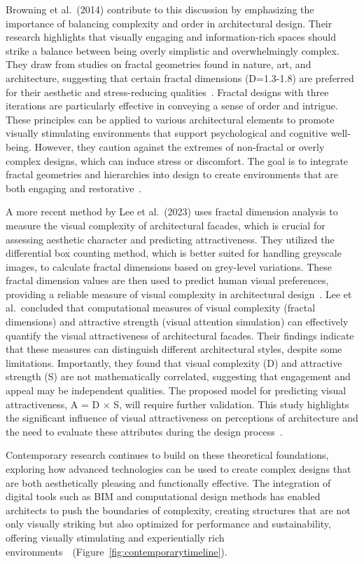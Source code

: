 Browning et al.~(2014) contribute to this discussion by emphasizing the importance of balancing complexity and order in architectural design.
Their research highlights that visually engaging and information-rich spaces should strike a balance between being overly simplistic and overwhelmingly complex.
They draw from studies on fractal geometries found in nature, art, and architecture, suggesting that certain fractal dimensions (D=1.3-1.8) are preferred for their aesthetic and stress-reducing qualities~\cite{Browning2014}.
Fractal designs with three iterations are particularly effective in conveying a sense of order and intrigue.
These principles can be applied to various architectural elements to promote visually stimulating environments that support psychological and cognitive well-being.
However, they caution against the extremes of non-fractal or overly complex designs, which can induce stress or discomfort.
The goal is to integrate fractal geometries and hierarchies into design to create environments that are both engaging and restorative~\cite{Browning2014}.

A more recent method by Lee et al.~(2023) uses fractal dimension analysis to measure the visual complexity of architectural facades, which is crucial for assessing aesthetic character and predicting attractiveness.
They utilized the differential box counting method, which is better suited for handling greyscale images, to calculate fractal dimensions based on grey-level variations.
These fractal dimension values are then used to predict human visual preferences, providing a reliable measure of visual complexity in architectural design~\cite{Lee2023}.
Lee et al.~concluded that computational measures of visual complexity (fractal dimensions) and attractive strength (visual attention simulation) can effectively quantify the visual attractiveness of architectural facades.
Their findings indicate that these measures can distinguish different architectural styles, despite some limitations.
Importantly, they found that visual complexity (D) and attractive strength (S) are not mathematically correlated, suggesting that engagement and appeal may be independent qualities.
The proposed model for predicting visual attractiveness, A = D × S, will require further validation.
This study highlights the significant influence of visual attractiveness on perceptions of architecture and the need to evaluate these attributes during the design process~\cite{Lee2023}.

Contemporary research continues to build on these theoretical foundations, exploring how advanced technologies can be used to create complex designs that are both aesthetically pleasing and functionally effective.
The integration of digital tools such as BIM and computational design methods has enabled architects to push the boundaries of complexity, creating structures that are not only visually striking but also optimized for performance and sustainability, offering visually stimulating and experientially rich environments~\cite{Leach2016}~(Figure~\ref{fig:contemporarytimeline}).

